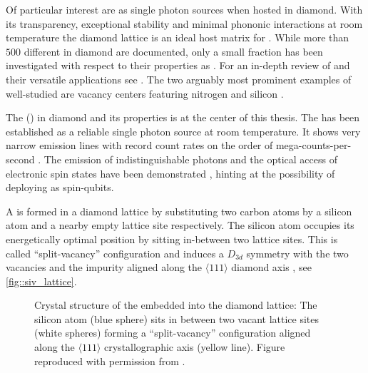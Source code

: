   Of particular interest are \ccs as single photon sources when hosted in diamond. With its transparency, exceptional stability and minimal phononic interactions at room temperature the diamond lattice is an ideal host matrix for \ccs \cite{Kennedy2003,Greentree2008}. While more than $500$ different \ccs in diamond are documented, only a small fraction has been investigated with respect to their properties as \spss \cite{Zaitsev2001}. For an in-depth review of \ccs and their versatile applications see \cite{Aharonovich2014, Prawer2014}. The two arguably most prominent examples of well-studied \ccs are vacancy centers featuring nitrogen and silicon \cite{Manson2006, Jelezko2002, Santori2006}.

  The \sivc (\siv) in diamond and its properties is at the center of this thesis. The \siv has been established as a reliable single photon source at room temperature. It shows very narrow emission lines with record count rates on the order of mega-counts-per-second \cite{Neu2012a}. The emission of indistinguishable photons and the optical access of electronic spin states have been demonstrated \cite{Sipahigil2014, Mueller2014, Pingault2014, Rogers2014a}, hinting at the possibility of deploying \sivs as spin-qubits.

  A \sivc is formed in a diamond lattice by substituting two carbon atoms by a silicon atom and a nearby empty lattice site respectively. The silicon atom occupies its energetically optimal position by sitting in-between two lattice sites. This is called ``split-vacancy'' configuration and induces a $D_{3d}$ symmetry with the two vacancies and the impurity aligned along the $\langle 111 \rangle$ diamond axis \cite{goss2007density}, see \autoref{fig::siv_lattice}.

  \begin{figure}[htbp]
		\centering
		\caption[Split-vacancy configuration for \sivs in diamond]{Crystal structure of the \siv embedded into the diamond lattice: The silicon atom (blue sphere) sits in between two vacant lattice sites (white spheres) forming a ``split-vacancy'' configuration aligned along the $\langle 111 \rangle$ crystallographic axis (yellow line). Figure reproduced with permission from \cite{Riedrich-moller2014}.}
		\label{fig::siv_lattice}
	\end{figure}


